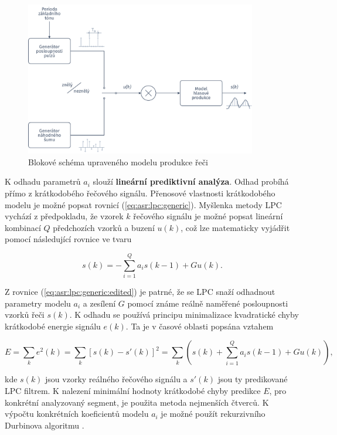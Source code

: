 \begin{figure}[hbpt]
  \centering
  \includegraphics[width=0.9\textwidth]{./ch4-asr/img/speech_process.pdf}
  \caption{Blokové schéma upraveného modelu produkce řeči}
  \label{fig:asr:model:speech:excitation}
\end{figure}

K odhadu parametrů $a_i$ slouží \textbf{lineární prediktivní analýza}. Odhad probíhá přímo z krátkodobého řečového signálu. Přenosové vlastnosti krátkodobého modelu je možné popsat rovnicí (\ref{eq:asr:lpc:generic}). Myšlenka metody LPC vychází z předpokladu, že vzorek $k$ řečového signálu je možné popsat lineární kombinací $Q$ předchozích vzorků a buzení $u(k)$, což lze matematicky vyjádřit pomocí následující rovnice ve tvaru

\begin{equation}
  s(k) = - \sum_{i = 1}^{Q} a_i s(k-1) + Gu(k).
  \label{eq:asr:lpc:generic:edited}
\end{equation}

\noindent Z rovnice (\ref{eq:asr:lpc:generic:edited}) je patrné, že se LPC snaží odhadnout parametry modelu $a_i$ a zesílení $G$ pomocí známe reálně naměřené posloupnosti vzorků řeči $s(k)$. K odhadu se používá principu minimalizace kvadratické chyby krátkodobé energie signálu $e\left(k\right)$. Ta je v časové oblasti popsána vztahem

\begin{equation}
  E = \sum_{k} e^2(k) = \sum_{k} \left[ s(k) - s'(k)\right]^2 = \sum_{k} \left( s(k) + \sum_{i = 1}^{Q} a_i s(k-1) + Gu(k) \right),
\end{equation}

\noindent kde $s(k)$ jsou vzorky reálného řečového signálu a $s'(k)$ jsou ty predikované LPC filtrem. K nalezení minimální hodnoty krátkodobé chyby predikce $E$, pro konkrétní analyzovaný segment, je použita metoda nejmenších čtverců. K výpočtu konkrétních koeficientů modelu $a_i$ je možné použít rekurzivního Durbinova algoritmu \cite{Holmes2001}.

